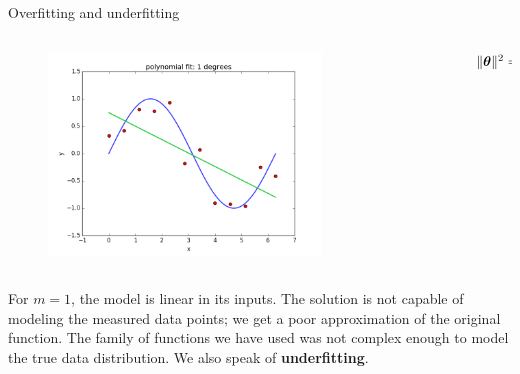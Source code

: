 \documentclass[xcolor=pdftex,dvipsnames,table]{beamer}
\begin{document}
\begin{frame}{Overfitting and underfitting}
\begin{columns}
\begin{column}{.8\textwidth}
\begin{figure}[htb]
	\includegraphics[width=0.75\textwidth]{../graphics/polyfit_degree_1.png}
\end{figure}
\end{column}
\begin{column}{.2\textwidth}
$\| \boldsymbol{\theta} \|^2 = 0.67$
\end{column}
\end{columns}
For $m=1$, the model is linear in its inputs. The solution is not capable of modeling the measured data points; we get a poor approximation of the original function. The family of functions we have used was not complex enough to model the true data distribution. We also speak of \textbf{underfitting}.
\end{frame}
\end{document}
